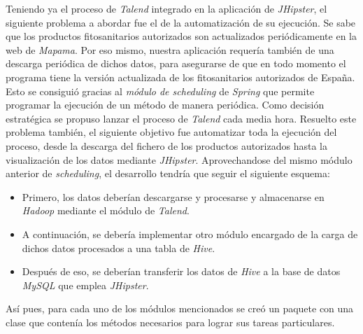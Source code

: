 \par
Teniendo ya el proceso de \textit{Talend} integrado en la aplicación de \textit{JHipster}, el siguiente problema a abordar fue el de la automatización de su ejecución. Se sabe que los productos fitosanitarios autorizados son actualizados periódicamente en la web de \textit{Mapama}. Por eso mismo, nuestra aplicación requería también de una descarga periódica de dichos datos, para asegurarse de que en todo momento el programa tiene la versión actualizada de los fitosanitarios autorizados de España. Esto se consiguió gracias al \textit{módulo de scheduling}\cite{spring_scheduling} de \textit{Spring} que permite programar la ejecución de un método de manera periódica. Como decisión estratégica se propuso lanzar el proceso de \textit{Talend} cada media hora. Resuelto este problema también, el siguiente objetivo fue automatizar toda la ejecución del proceso, desde la descarga del fichero de los productos autorizados hasta la visualización de los datos mediante \textit{JHipster}. Aprovechandose del mismo módulo anterior de \textit{scheduling}, el desarrollo tendría que seguir el siguiente esquema: 
\begin{itemize}
\item Primero, los datos deberían descargarse y procesarse y almacenarse en \textit{Hadoop} mediante el módulo de \textit{Talend}.
\item A continuación, se debería implementar otro módulo encargado de la carga de dichos datos procesados a una tabla de \textit{Hive}.
\item Después de eso, se deberían transferir los datos de \textit{Hive} a la base de datos \textit{MySQL} que emplea \textit{JHipster}.
\end{itemize}
  \par Así pues, para cada uno de los módulos mencionados se creó un paquete con una clase que contenía los métodos necesarios para lograr sus tareas particulares.


